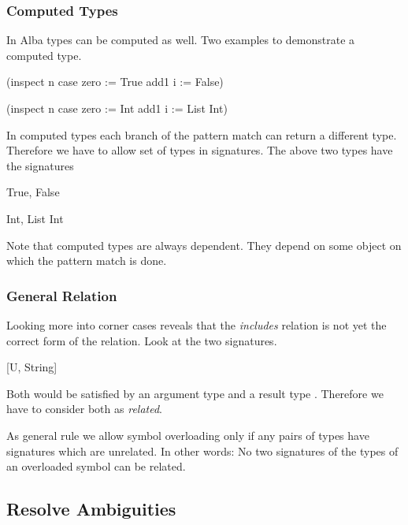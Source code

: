 \subsubsection{Computed Types}

In Alba types can be computed as well. Two examples to demonstrate a computed
type.
%
\begin{alba}
    (inspect n case
        zero := True
        add1 i := False)

    (inspect n case
        zero := Int
        add1 i := List Int)
\end{alba}
%
In computed types each branch of the pattern match can return a different type.
Therefore we have to allow set of types in signatures. The above two types have
the signatures
%
\begin{alba}
    {True, False}

    {Int, List Int}
\end{alba}

Note that computed types are always dependent. They depend on some object on
which the pattern match is done.







\subsubsection{General Relation}

Looking more into corner cases reveals that the \emph{includes} relation is not
yet the correct form of the relation. Look at the two signatures.
%
\begin{alba}
    [Int, U]

    [U, String]
\end{alba}

Both would be satisfied by an argument type  and a result type
. Therefore we have to consider both as \emph{related}.

As general rule we allow symbol overloading only if any pairs of types have
signatures which are unrelated. In other words: No two signatures of the types
of an overloaded symbol can be related.










\subsection{Resolve Ambiguities}

